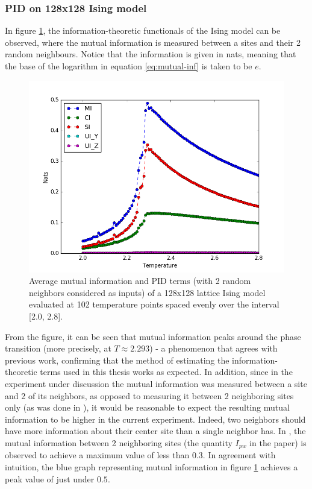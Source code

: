 \documentclass[12pt]{article}
\begin{document}
\subsubsection{PID on 128x128 Ising model}

In figure \ref{fig:ising-128-pid-2-nbs}, the information-theoretic functionals of the Ising model can be observed, where the mutual information is measured between a sites and their 2 random neighbours. Notice that the information is given in nats, meaning that the base of the logarithm in equation \ref{eq:mutual-inf} is taken to be $e$. 

\begin{figure} [h!]
\begin{center}
\includegraphics[width=.9\textwidth]{ising-128-pid-2-nbs}
\caption{Average mutual information and PID terms (with 2 random neighbors considered as inputs) of a 128x128 lattice Ising model evaluated at 102 temperature points spaced evenly over the interval [2.0, 2.8].}
\label{fig:ising-128-pid-2-nbs}
\end{center}
\end{figure}

From the figure, it can be seen that mutual information peaks around the phase transition (more precisely, at $T \approx 2.293$) - a phenomenon that agrees with previous work, confirming that the method of estimating the information-theoretic terms used in this thesis works as expected. In addition, since in the experiment under discussion the mutual information was measured between a site and 2 of its neighbors, as opposed to measuring it between 2 neighboring sites only (as was done in \cite{barnett-ising}), it would be reasonable to expect the resulting mutual information to be higher in the current experiment. Indeed, two neighbors should have more information about their center site than a single neighbor has. In \cite{barnett-ising}, the mutual information between 2 neighboring sites (the quantity $I_{pw}$ in the paper) is observed to achieve a maximum value of less than $0.3$. In agreement with intuition, the blue graph representing mutual information in figure \ref{fig:ising-128-pid-2-nbs} achieves a peak value of just under $0.5$.
\end{document}
